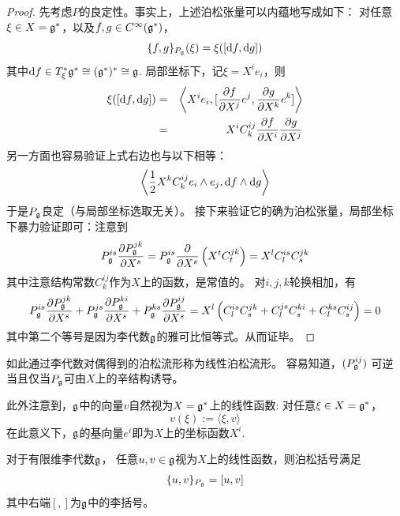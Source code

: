\begin{proof}
先考虑$P$的良定性。事实上，上述泊松张量可以内蕴地写成如下：
对任意$\xi\in X=\mathfrak{g}^*$，以及$f,g\in C^{\infty}(\mathfrak{g}^*)$，
$$\{f,g\}_{P_{\mathfrak{g}}}(\xi)=\xi([\mathrm{d} f,\mathrm{d} g])$$
其中$\mathrm{d} f \in T_{\xi}^*\mathfrak{g}^*\cong(\mathfrak{g}^*)^*\cong\mathfrak{g}$.
局部坐标下，记$\xi=X^ie_i$，则
\begin{eqnarray*}
     \xi([\mathrm{d} f,\mathrm{d} g])
&=&
     \left\langle
       X^ie_i
     ,
       [\frac{\partial f} {\partial X^j}e^j,\frac{\partial g} {\partial X^k}e^k]
     \right\rangle\\
&=&
     X^iC^{ij}_k
     \frac{\partial f} {\partial X^i}
     \frac{\partial g} {\partial X^j}
\end{eqnarray*}
另一方面也容易验证上式右边也与以下相等：
$$
  \left\langle
    \frac{1}{2}X^kC^{ij}_ke_i\wedge e_j
  ,
    \mathrm{d} f\wedge\mathrm{d} g
  \right\rangle
$$
于是$P_{\mathfrak{g}}$良定（与局部坐标选取无关）。
接下来验证它的确为泊松张量，局部坐标下暴力验证即可：注意到
\begin{eqnarray*}
     P^{is}_{\mathfrak{g}}\frac{\partial P^{jk}_{\mathfrak{g}}} {\partial X^s}
=
     P^{is}_{\mathfrak{g}}\frac{\partial } {\partial X^s}
     \left(
       X^tC_t^{jk}
     \right)
=
     X^lC_l^{is}C_{s}^{jk}
\end{eqnarray*}
其中注意结构常数$C^{ij}_k$作为$X$上的函数，是常值的。
对$i,j,k$轮换相加，有
\begin{eqnarray*}
     P^{is}_{\mathfrak{g}}\frac{\partial P^{jk}_{\mathfrak{g}}} {\partial X^s}
    +P^{js}_{\mathfrak{g}}\frac{\partial P^{ki}_{\mathfrak{g}}} {\partial X^s}
    +P^{ks}_{\mathfrak{g}}\frac{\partial P^{ij}_{\mathfrak{g}}} {\partial X^s}
=
     X^l
     \left(
       C^{is}_lC^{jk}_s
      +C^{js}_lC^{ki}_s
      +C^{ks}_lC^{ij}_s
     \right)
=0
\end{eqnarray*}
其中第二个等号是因为李代数$\mathfrak{g}$的雅可比恒等式。从而证毕。
\end{proof}

如此通过李代数对偶得到的泊松流形称为线性泊松流形。
容易知道，$(P^{ij}_{\mathfrak{g}})$
可逆当且仅当$P_{\mathfrak{g}}$可由$X$上的辛结构诱导。


此外注意到，$\mathfrak{g}$中的向量$v$自然视为$X=\mathfrak{g}^*$上的线性函数:
对任意$\xi\in X=\mathfrak{g}^*$，
$$v(\xi):=\langle\xi,v\rangle$$
在此意义下，$\mathfrak{g}$的基向量$e^i$即为$X$上的坐标函数$X^i$.

\begin{prop}对于有限维李代数$\mathfrak{g}$，
任意$u,v\in\mathfrak{g}$视为$X$上的线性函数，则泊松括号满足
$$\{u,v\}_{P_{\mathfrak{g}}}=[u,v]$$
其中右端$[,]$为$\mathfrak{g}$中的李括号。
\label{李代数对偶-李括号与泊松括号的关系-prop}
\end{prop}

